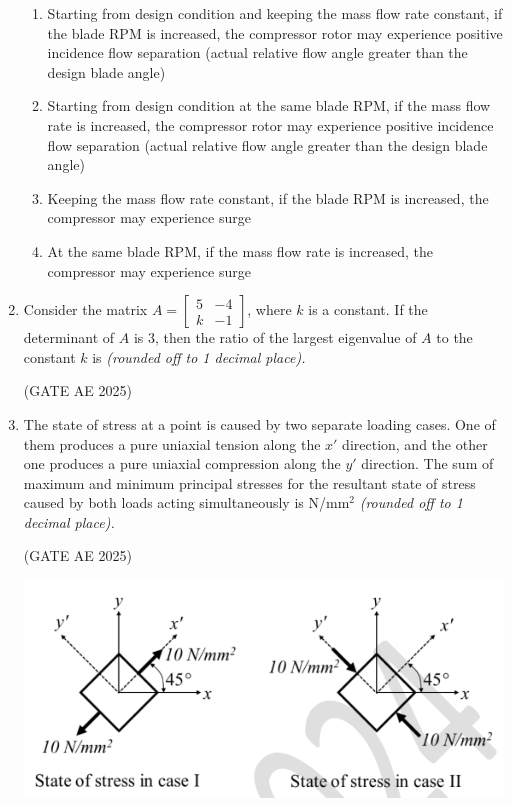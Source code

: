 \documentclass[journal,12pt,onecolumn]{IEEEtran}
\theoremstyle{remark}
\begin{document}
\begin{flushleft}
\begin{enumerate}
\begin{enumerate}
\item Starting from design condition and keeping the mass flow rate constant, if the blade RPM is increased, the compressor rotor may experience positive incidence flow separation (actual relative flow angle greater than the design blade angle)  
\item Starting from design condition at the same blade RPM, if the mass flow rate is increased, the compressor rotor may experience positive incidence flow separation (actual relative flow angle greater than the design blade angle)  
\item Keeping the mass flow rate constant, if the blade RPM is increased, the compressor may experience surge  
\item At the same blade RPM, if the mass flow rate is increased, the compressor may experience surge  
\end{enumerate}

\item Consider the matrix $A = \begin{bmatrix} 5 & -4 \\ k & -1 \end{bmatrix}$, where $k$ is a constant. If the determinant of $A$ is 3, then the ratio of the largest eigenvalue of $A$ to the constant $k$ is \underline{\hspace{3cm}} \textit{(rounded off to 1 decimal place).} 

\hfill (GATE AE 2025)

\item The state of stress at a point is caused by two separate loading cases. One of them produces a pure uniaxial tension along the $x'$ direction, and the other one produces a pure uniaxial compression along the $y'$ direction. The sum of maximum and minimum principal stresses for the resultant state of stress caused by both loads acting simultaneously is \underline{\hspace{3cm}} N/mm$^2$ \textit{(rounded off to 1 decimal place).}

\hfill (GATE AE 2025)

\begin{center}
\includegraphics[width=0.8\columnwidth]{figs/52.png}
\end{center}



\end{enumerate}
\end{flushleft}
\end{document}
